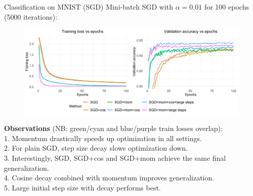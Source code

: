 \documentclass[11pt,compress,t,notes=noshow, xcolor=table]{beamer}
\begin{document}
\begin{vbframe}{Classification on MNIST (SGD)}
\vspace{-0.3cm}
Mini-batch SGD with $\alpha=0.01$ for 100 epochs (5000 iterations):
\begin{figure}
            \includegraphics[width=1.0\textwidth]{slides/04-multivariate-first-order/figure_man/simu_mnist/SGD_compar.pdf} \\
\end{figure}
{\footnotesize
\textbf{Observations} (NB: green/cyan and blue/purple train losses overlap):\\ 1. Momentum drastically speeds up optimization in all settings.\\
2. For plain SGD, step size decay slows optimization down. \\
3. Interestingly, SGD, SGD+cos and SGD+mom achieve the same final generalization. \\
4. Cosine decay combined with momentum improves generalization. \\
5. Large initial step size with decay performs best.}
\end{vbframe}
\end{document}
